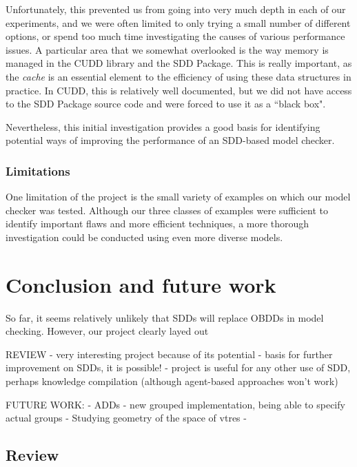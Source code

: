 \documentclass[11pt]{report}
\begin{document}
Unfortunately, this prevented us from going into very much depth in each of our experiments, and we were often limited to only trying a small number of different options, or spend too much time investigating the causes of various performance issues. A particular area that we somewhat overlooked is the way memory is managed in the CUDD library and the SDD Package. This is really important, as the \textit{cache} is an essential element to the efficiency of using these data structures in practice. In CUDD, this is relatively well documented, but we did not have access to the SDD Package source code and were forced to use it as a ``black box".

Nevertheless, this initial investigation provides a good basis for identifying potential ways of improving the performance of an SDD-based model checker. 

\subsection{Limitations}

One limitation of the project is the small variety of examples on which our model checker was tested. Although our three classes of examples were sufficient to identify important flaws and more efficient techniques, a more thorough investigation could be conducted using even more diverse models.  



\chapter{Conclusion and future work}

So far, it seems relatively unlikely that SDDs will replace OBDDs in model checking. However, our project clearly layed out 




REVIEW
- very interesting project because of its potential
- basis for further improvement on SDDs, it is possible!
- project is useful for any other use of SDD, perhaps knowledge compilation (although agent-based approaches won't work)

FUTURE WORK: 
- ADDs
- new grouped implementation, being able to specify actual groups
- Studying geometry of the space of vtres
- 


\section{Review}
\end{document}
